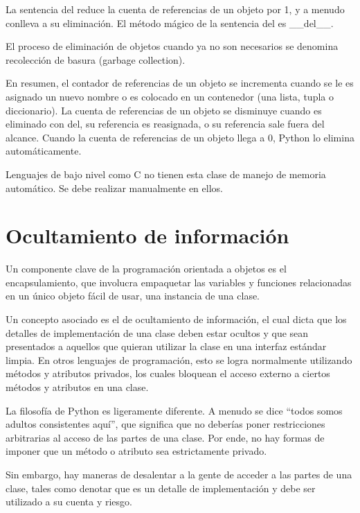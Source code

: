 \documentclass{report}
\newcommand{\doble}[1]{``#1''}
\begin{document}
La sentencia del reduce la cuenta de referencias de un objeto por 1, y a menudo conlleva a su eliminación. El método mágico de la sentencia del es \_\_del\_\_.\smallskip

El proceso de eliminación de objetos cuando ya no son necesarios se denomina recolección de basura (garbage collection).\smallskip

En resumen, el contador de referencias de un objeto se incrementa cuando se le es asignado un nuevo nombre o es colocado en un contenedor (una lista, tupla o diccionario). La cuenta de referencias de un objeto se disminuye cuando es eliminado con del, su referencia es reasignada, o su referencia sale fuera del alcance. Cuando la cuenta de referencias de un objeto llega a 0, Python lo elimina automáticamente.


Lenguajes de bajo nivel como C no tienen esta clase de manejo de memoria automático. Se debe realizar manualmente en ellos.

\section{Ocultamiento de información}

Un componente clave de la programación orientada a objetos es el encapsulamiento, que involucra empaquetar las variables y funciones relacionadas en un único objeto fácil de usar, una instancia de una clase.\smallskip

Un concepto asociado es el de ocultamiento de información, el cual dicta que los detalles de implementación de una clase deben estar ocultos y que sean presentados a aquellos que quieran utilizar la clase en una interfaz estándar limpia. En otros lenguajes de programación, esto se logra normalmente utilizando métodos y atributos privados, los cuales bloquean el acceso externo a ciertos métodos y atributos en una clase.\smallskip

La filosofía de Python es ligeramente diferente. A menudo se dice \doble{todos somos adultos consistentes aquí}, que significa que no deberías poner restricciones arbitrarias al acceso de las partes de una clase. Por ende, no hay formas de imponer que un método o atributo sea estrictamente privado.\smallskip

Sin embargo, hay maneras de desalentar a la gente de acceder a las partes de una clase, tales como denotar que es un detalle de implementación y debe ser utilizado a su cuenta y riesgo.\smallskip
\end{document}

